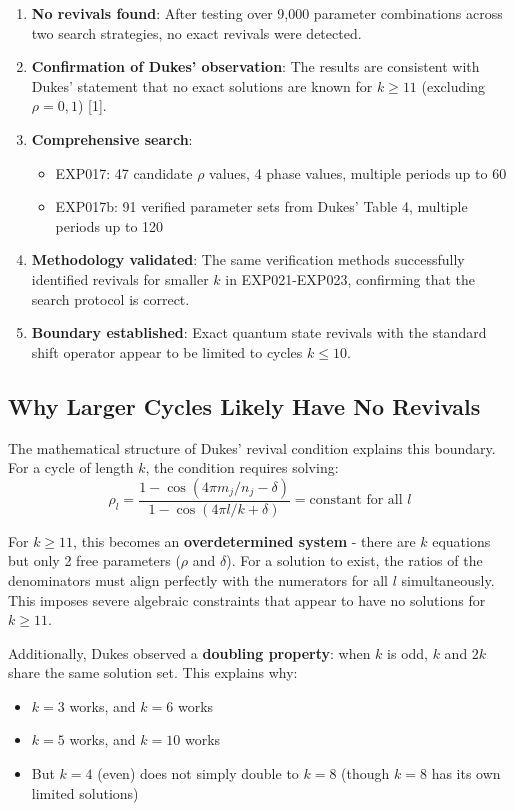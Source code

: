 \documentclass[12pt]{article}
\begin{document}
\begin{enumerate}
    \item \textbf{No revivals found}: After testing over 9,000 parameter combinations across two search strategies, no exact revivals were detected.
    
    \item \textbf{Confirmation of Dukes' observation}: The results are consistent with Dukes' statement that no exact solutions are known for $k \geq 11$ (excluding $\rho = 0, 1$) [1].
    
    \item \textbf{Comprehensive search}: 
    \begin{itemize}
        \item EXP017: 47 candidate $\rho$ values, 4 phase values, multiple periods up to 60
        \item EXP017b: 91 verified parameter sets from Dukes' Table 4, multiple periods up to 120
    \end{itemize}
    
    \item \textbf{Methodology validated}: The same verification methods successfully identified revivals for smaller $k$ in EXP021-EXP023, confirming that the search protocol is correct.
    
    \item \textbf{Boundary established}: Exact quantum state revivals with the standard shift operator appear to be limited to cycles $k \leq 10$.
\end{enumerate}

\subsection{Why Larger Cycles Likely Have No Revivals}

The mathematical structure of Dukes' revival condition explains this boundary. For a cycle of length $k$, the condition requires solving:
\[
\rho_l = \frac{1-\cos(4\pi m_j/n_j - \delta)}{1-\cos(4\pi l/k + \delta)} = \text{constant for all } l
\]

For $k \geq 11$, this becomes an \textbf{overdetermined system} - there are $k$ equations but only 2 free parameters ($\rho$ and $\delta$). For a solution to exist, the ratios of the denominators must align perfectly with the numerators for all $l$ simultaneously. This imposes severe algebraic constraints that appear to have no solutions for $k \geq 11$.

Additionally, Dukes observed a \textbf{doubling property}: when $k$ is odd, $k$ and $2k$ share the same solution set. This explains why:
\begin{itemize}
    \item $k=3$ works, and $k=6$ works
    \item $k=5$ works, and $k=10$ works
    \item But $k=4$ (even) does not simply double to $k=8$ (though $k=8$ has its own limited solutions)
\end{itemize}
\end{document}
